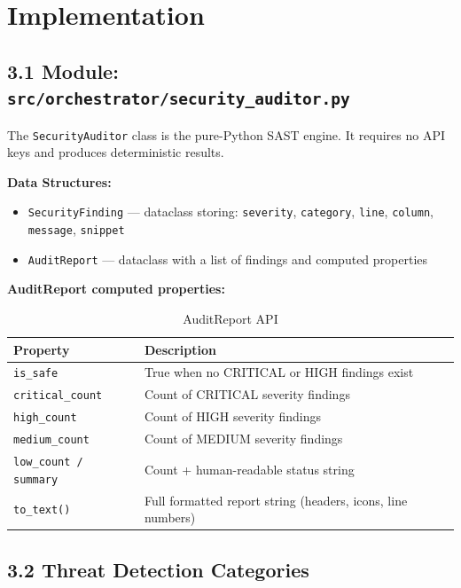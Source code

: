 \documentclass[a4paper,11pt]{article}
\begin{document}
\section{Implementation}

\subsection{3.1 Module: \texttt{src/orchestrator/security\_auditor.py}}

The \texttt{SecurityAuditor} class is the pure-Python SAST engine. It requires no API keys and produces deterministic results.

\textbf{Data Structures:}
\begin{itemize}
    \item \texttt{SecurityFinding} — dataclass storing: \texttt{severity}, \texttt{category}, \texttt{line}, \texttt{column}, \texttt{message}, \texttt{snippet}
    \item \texttt{AuditReport} — dataclass with a list of findings and computed properties
\end{itemize}

\textbf{AuditReport computed properties:}

\begin{table}[h]
\centering
\begin{tabularx}{\textwidth}{|l|X|}
\hline
\rowcolor{red!10}
\textbf{Property} & \textbf{Description} \\
\hline
\texttt{is\_safe} & True when no CRITICAL or HIGH findings exist \\
\hline
\texttt{critical\_count} & Count of CRITICAL severity findings \\
\hline
\texttt{high\_count} & Count of HIGH severity findings \\
\hline
\texttt{medium\_count} & Count of MEDIUM severity findings \\
\hline
\texttt{low\_count / summary} & Count + human-readable status string \\
\hline
\texttt{to\_text()} & Full formatted report string (headers, icons, line numbers) \\
\hline
\end{tabularx}
\caption{AuditReport API}
\end{table}

\subsection{3.2 Threat Detection Categories}
\end{document}
